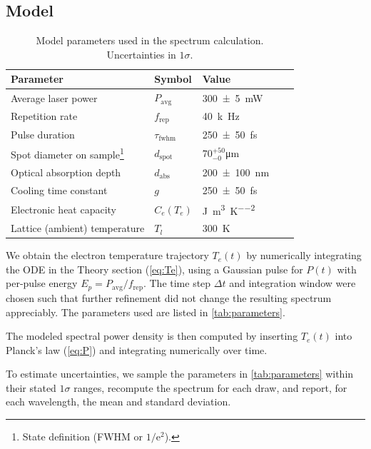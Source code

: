 \documentclass[
	parskip=half,
	a4paper,
]{scrarticle}
\begin{document}
\subsection{Model}
\begin{table}
    \centering
    \begin{tabular}{lllll}
        Parameter & Symbol & Value & \\
        \hline
        Average laser power & $P_{\text{avg}}$ & \SI{300(5)}{mW} &  &  \\
        Repetition rate & $f_{\text{rep}}$ & \SI{40}{k\hertz} &  &  \\
        Pulse duration & $\tau_\text{fwhm}$ & \SI{250(50)}{fs}& \\
        Spot diameter on sample\footnote{State definition (FWHM or $1/\mathrm e^2$).} & $d_{\text{spot}}$ & $70^{+50}_{-0}$\;\si{\micro\metre}\\
        Optical absorption depth & $d_{\text{abs}}$ & \SI{200(100)}{\nano\metre} & \cite{smausz_determination_2017} &  \\
        Cooling time constant & $g$ & \SI{250(50)}{fs} & \cite{stange_hot_2015} &  \\
        Electronic heat capacity & $C_e(T_e)$ & \si{\joule\per\metre\cubed\per\kelvin\squared} & \cite{nihira_temperature_2003} &  \\
        Lattice (ambient) temperature & $T_l$ & \SI{300}{\kelvin} & &  \\
    \end{tabular}
    \caption{Model parameters used in the spectrum calculation. Uncertainties in $1\sigma$.}
    \label{tab:parameters}
\end{table}

We obtain the electron temperature trajectory $T_e(t)$ by numerically integrating the ODE in the Theory section (\autoref{eq:Te}), using a Gaussian pulse for $P(t)$ with per-pulse energy $E_p = P_{\text{avg}}/f_{\text{rep}}$. The time step $\Delta t$ and integration window were chosen such that further refinement did not change the resulting spectrum appreciably. The parameters used are listed in \autoref{tab:parameters}.

The modeled spectral power density is then computed by inserting $T_e(t)$ into Planck’s law (\autoref{eq:P}) and integrating numerically over time.

To estimate uncertainties, we sample the parameters in \autoref{tab:parameters} within their stated $1\sigma$ ranges, recompute the spectrum for each draw, and report, for each wavelength, the mean and standard deviation.
\end{document}
